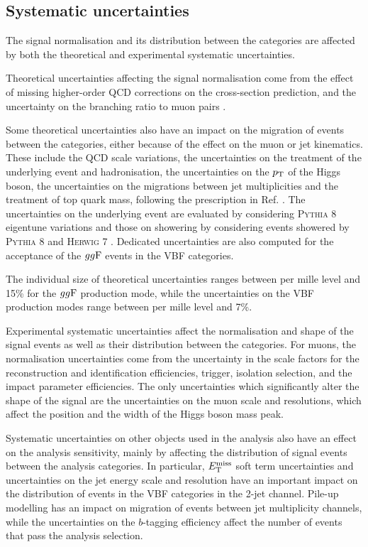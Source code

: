 \subsection{Systematic uncertainties}

The signal normalisation and its distribution between the categories
are affected by both the theoretical and experimental systematic
uncertainties.

Theoretical uncertainties affecting the signal normalisation come from
the effect of missing higher-order QCD corrections on the cross-section
prediction, and the uncertainty on the branching ratio to muon pairs
\cite{deFlorian:2016spz}.

Some theoretical uncertainties also have an impact on the migration
of events between the categories, either because of the effect on the muon
or jet kinematics. These include the QCD scale variations, the uncertainties
on the treatment of the underlying event and hadronisation, the uncertainties
on the $p_{\text{T}}$ of the Higgs boson, the uncertainties on the migrations between
jet multiplicities and the treatment of top quark mass, following 
the prescription in Ref. \cite{deFlorian:2016spz}. The uncertainties
on the underlying event are evaluated by considering \textsc{Pythia} 8
eigentune variations and those on showering by considering events
showered by \textsc{Pythia} 8 and \textsc{Herwig} 7 \cite{Bahr:2008pv,
Bellm:2015jjp}. Dedicated uncertainties are also computed for the
acceptance of the $gg\text{F}$ events in the VBF categories.

The individual size of theoretical uncertainties ranges between 
per mille level and 15\% for the $gg\text{F}$ production mode,
while the uncertainties on the VBF production modes range
between per mille level and 7\%.

Experimental systematic uncertainties affect the normalisation
and shape of the signal events as well as their distribution
between the categories. For muons, the normalisation uncertainties come from the 
uncertainty in the scale factors for the reconstruction and
identification efficiencies, trigger, isolation selection, and
the impact parameter efficiencies. The only uncertainties which significantly alter the shape of the 
signal are the uncertainties on the muon scale and resolutions,
which affect the position and the width of the Higgs boson mass peak.

Systematic uncertainties on other objects used in the analysis
also have an effect on the analysis sensitivity, mainly by
affecting the distribution of signal events between the analysis
categories. In particular, $E_\text{T}^\text{miss}$ soft term uncertainties and 
uncertainties on the jet energy scale and resolution have an
important impact on the distribution of events in the VBF
categories in the 2-jet channel. Pile-up modelling has an
impact on migration of events between jet multiplicity channels,
while the uncertainties on the $b$-tagging efficiency affect
the number of events that pass the analysis selection.

